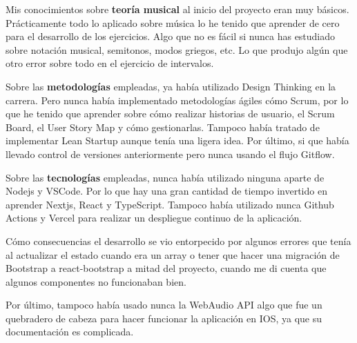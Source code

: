 \documentclass[12pt,twoside,titlepage]{report}
\begin{document}
Mis conocimientos sobre \textbf{teoría musical} al inicio del proyecto eran muy básicos. Prácticamente todo lo aplicado sobre música lo he tenido que aprender de cero para el desarrollo de los ejercicios. Algo que no es fácil si nunca has estudiado sobre notación musical, semitonos, modos griegos, etc. Lo que produjo algún que otro error sobre todo en el ejercicio de intervalos.

Sobre las \textbf{metodologías} empleadas, ya había utilizado Design Thinking en la carrera. Pero nunca había implementado metodologías ágiles cómo Scrum, por lo que he tenido que aprender sobre cómo realizar historias de usuario, el Scrum Board, el User Story Map y cómo gestionarlas. Tampoco había tratado de implementar Lean Startup aunque tenía una ligera idea. Por último, si que había llevado control de versiones anteriormente pero nunca usando el flujo Gitflow.

Sobre las \textbf{tecnologías} empleadas, nunca había utilizado ninguna aparte de Nodejs y VSCode. Por lo que hay una gran cantidad de tiempo invertido en aprender Nextjs, React y TypeScript. Tampoco había utilizado nunca Github Actions y Vercel para realizar un despliegue continuo de la aplicación. 

Cómo consecuencias el desarrollo se vio entorpecido por algunos errores que tenía al actualizar el estado cuando era un array o tener que hacer una migración de Bootstrap a react-bootstrap a mitad del proyecto, cuando me di cuenta que algunos componentes no funcionaban bien. 

Por último, tampoco había usado nunca la WebAudio API algo que fue un quebradero de cabeza para hacer funcionar la aplicación en IOS, ya que su documentación es complicada.
\end{document}
